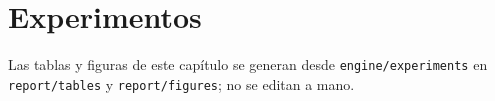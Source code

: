 \chapter{Experimentos}\label{cap:experimentos}

Las tablas y figuras de este capítulo se generan desde \texttt{engine/experiments} en
\texttt{report/tables} y \texttt{report/figures}; no se editan a mano.

